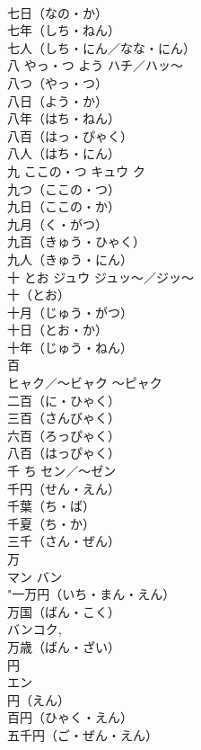 \documentclass[8pt]{extreport}
\begin{document}
\begin{CJK}{UTF8}{min}
\\	七日（なの・か）　
\\	七年（しち・ねん）　
\\	七人（しち・にん／なな・にん）　
\\	八	やっ・つ よう	ハチ／ハッ～	
\\	八つ（やっ・つ）　
\\	八日（よう・か）　
\\	八年（はち・ねん）　
\\	八百（はっ・ぴゃく）　
\\	八人（はち・にん）　
\\	九	ここの・つ	キュウ ク	
\\	九つ（ここの・つ）　
\\	九日（ここの・か）　
\\	九月（く・がつ）　
\\	九百（きゅう・ひゃく）　
\\	九人（きゅう・にん）　
\\	十	とお	ジュウ ジュッ～／ジッ～	
\\	十（とお）　
\\	十月（じゅう・がつ）　
\\	十日（とお・か）　
\\	十年（じゅう・ねん）　
\\	百	
\\	ヒャク／～ビャク ～ピャク	
\\	二百（に・ひゃく）　
\\	三百（さんびゃく）　
\\	六百（ろっぴゃく）　
\\	八百（はっぴゃく）　
\\	千	ち	セン／～ゼン	
\\	千円（せん・えん）　
\\	千葉（ち・ば）　
\\	千夏（ち・か）　
\\	三千（さん・ぜん）　
\\	万	
\\	マン バン	
\\	"一万円（いち・まん・えん）　
\\	万国（ばん・こく）　
\\	バンコク, 
\\	万歳（ばん・ざい）　
\\	円	
\\	エン	
\\	円（えん）　
\\	百円（ひゃく・えん）　
\\	五千円（ご・ぜん・えん）　

\end{CJK}
\end{document}
